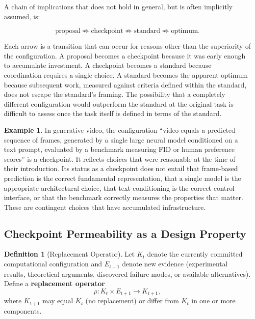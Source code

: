 \documentclass[11pt,a4paper]{article}
\theoremstyle{plain}
\theoremstyle{definition}
\newtheorem{definition}[theorem]{Definition}
\newtheorem{example}[theorem]{Example}
\theoremstyle{remark}
\begin{document}
A chain of implications that does not hold in general, but is often implicitly assumed, is:

\[
\text{proposal} \not\Rightarrow \text{checkpoint} \not\Rightarrow \text{standard} \not\Rightarrow \text{optimum}.
\]

Each arrow is a transition that can occur for reasons other than the superiority of the configuration. A proposal becomes a checkpoint because it was early enough to accumulate investment. A checkpoint becomes a standard because coordination requires a single choice. A standard becomes the apparent optimum because subsequent work, measured against criteria defined within the standard, does not escape the standard's framing. The possibility that a completely different configuration would outperform the standard at the original task is difficult to assess once the task itself is defined in terms of the standard.

\begin{example}
In generative video, the configuration ``video equals a predicted sequence of frames, generated by a single large neural model conditioned on a text prompt, evaluated by a benchmark measuring FID or human preference scores'' is a checkpoint. It reflects choices that were reasonable at the time of their introduction. Its status as a checkpoint does not entail that frame-based prediction is the correct fundamental representation, that a single model is the appropriate architectural choice, that text conditioning is the correct control interface, or that the benchmark correctly measures the properties that matter. These are contingent choices that have accumulated infrastructure.
\end{example}

\subsection{Checkpoint Permeability as a Design Property}

\begin{definition}[Replacement Operator]
Let $K_t$ denote the currently committed computational configuration and $E_{t+1}$ denote new evidence (experimental results, theoretical arguments, discovered failure modes, or available alternatives). Define a \textbf{replacement operator}
\[
\rho : K_t \times E_{t+1} \to K_{t+1},
\]
where $K_{t+1}$ may equal $K_t$ (no replacement) or differ from $K_t$ in one or more components.
\end{definition}
\end{document}
